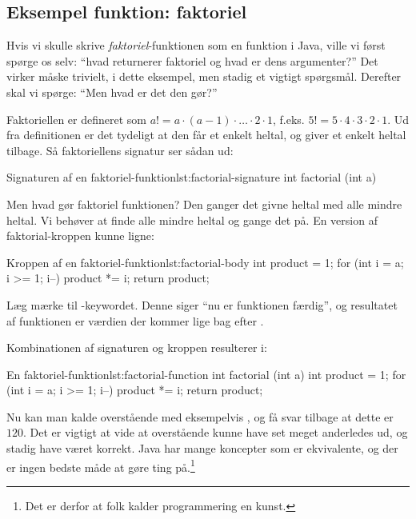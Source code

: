 	\subsection{Eksempel funktion: faktoriel}

        Hvis vi skulle skrive \emph{faktoriel}-funktionen som en
        funktion i Java, ville vi først spørge os selv: ``hvad
        returnerer faktoriel og hvad er dens argumenter?'' Det virker
        måske trivielt, i dette eksempel, men stadig et vigtigt
        spørgsmål. Derefter skal vi spørge: ``Men hvad er det den
        gør?''

        Faktoriellen er defineret som \(a! = a \cdot (a-1) \cdot \dots
        \cdot 2 \cdot 1\), f.eks. \(5! = 5 \cdot 4 \cdot 3 \cdot 2
        \cdot 1\). Ud fra definitionen er det tydeligt at den får et
        enkelt heltal, og giver et enkelt heltal tilbage. Så
        faktoriellens signatur ser sådan ud:

		\begin{JavaCode}{Signaturen af en faktoriel-funktion}{lst:factorial-signature}
			int factorial (int a)
		\end{JavaCode}

		Men hvad gør faktoriel funktionen? Den ganger det givne heltal med alle mindre
		heltal. Vi behøver at finde alle mindre heltal og gange det på. En version
		af faktorial-kroppen kunne ligne:

		\begin{JavaCode}{Kroppen af en faktoriel-funktion}{lst:factorial-body}
			int product = 1;
			for (int i = a; i >= 1; i--)
				product *= i;
			return product;
		\end{JavaCode}

        Læg mærke til -keywordet. Denne siger ``nu
        er funktionen færdig'', og resultatet af funktionen er værdien
        der kommer lige bag efter .

		Kombinationen af signaturen og kroppen resulterer i:

		\begin{JavaCode}{En faktoriel-funktion}{lst:factorial-function}
			int factorial (int a) {
				int product = 1;
				for (int i = a; i >= 1; i--)
					product *= i;
				return product;
			}
		\end{JavaCode}

        Nu kan man kalde overstående med eksempelvis
        , og få svar tilbage at dette er
        \(120\). Det er vigtigt at vide at overstående kunne have set
        meget anderledes ud, og stadig have været korrekt. Java har
        mange koncepter som er ekvivalente, og der er ingen bedste
        måde at gøre ting på.\footnote{Det er derfor at folk kalder
        programmering en kunst.}

